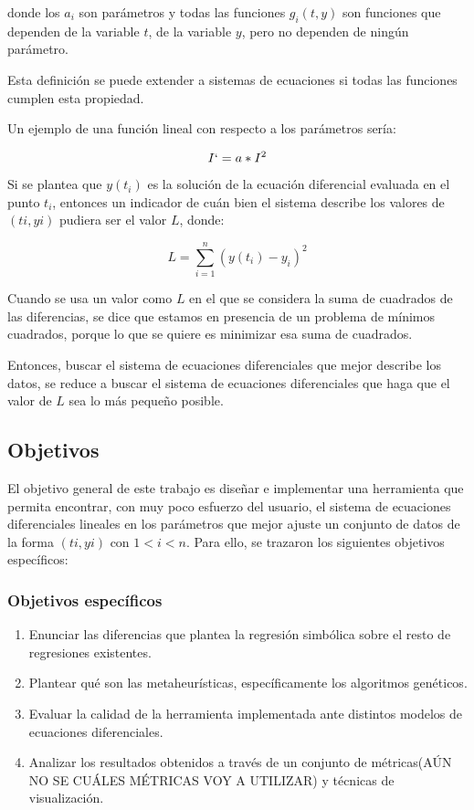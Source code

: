 donde los $a_i$ son parámetros y todas las funciones $g_i(t,y)$ son funciones que dependen de la variable $t$, de la variable $y$, pero no dependen de ningún parámetro.

Esta definición se puede extender a sistemas de ecuaciones si todas las funciones cumplen esta propiedad.

Un ejemplo de una función lineal con respecto a los parámetros sería:

\begin{equation}
    \label{eqn:ode_example}
    I` = a * I^2
\end{equation}

Si se plantea que $y(t_i)$ es la solución de la ecuación diferencial evaluada en el punto $t_i$, entonces un indicador de cuán bien el sistema describe los valores de $(ti, yi)$ pudiera ser el valor $L$, donde:

$$L = \sum_{i=1}^{n} (y(t_i) - y_i)^2$$

Cuando se usa un valor como $L$ en el que se considera la suma de cuadrados de las diferencias, se dice que estamos en presencia de un problema de mínimos cuadrados, porque lo que se quiere es minimizar esa suma de cuadrados.

Entonces, buscar el sistema de ecuaciones diferenciales que mejor describe los datos, se reduce a buscar el sistema de ecuaciones diferenciales que haga que el valor de $L$ sea lo más pequeño posible.

\subsection*{Objetivos}

El objetivo general de este trabajo es diseñar e implementar una herramienta que permita encontrar, con muy poco esfuerzo del usuario, el sistema de ecuaciones diferenciales lineales en los parámetros que mejor ajuste un conjunto de datos de la forma $(ti, yi)$ con $1 < i < n$. Para ello, se trazaron los siguientes objetivos específicos:


\subsubsection*{Objetivos específicos}

\begin{enumerate}
    \item Enunciar las diferencias que plantea la regresión simbólica sobre el resto de regresiones existentes.
    \item Plantear qué son las metaheurísticas, específicamente los algoritmos genéticos.
    \item Evaluar la calidad de la herramienta implementada ante distintos modelos de ecuaciones diferenciales.
    \item Analizar los resultados obtenidos a través de un conjunto de métricas(AÚN NO SE CUÁLES MÉTRICAS VOY A UTILIZAR) y técnicas de visualización.
\end{enumerate}

